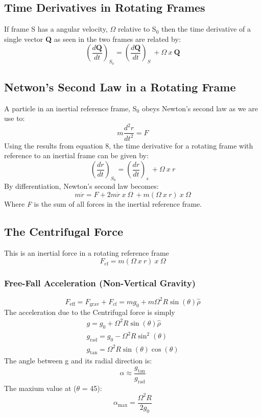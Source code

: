 \documentclass[11pt]{article}
\theoremstyle{definition}
\begin{document}
\subsection{Time Derivatives in Rotating Frames}
If frame S has a angular velocity, $\Omega$ relative to S$_0$ then the time derivative of a single vector \textbf{Q} as seen in the two frames are related by:
\begin{equation}
(\frac{d\textbf{Q}}{dt})_{S_0} = (\frac{d\textbf{Q}}{dt})_{S} \ + \Omega \ x \ \textbf{Q}
\end{equation}
\subsection{Netwon's Second Law in a Rotating Frame}
A particle in an inertial reference frame, S$_0$ obeys Newton's second law as we are use to:
\begin{equation}
m\frac{d^2r}{dt^2} = F
\end{equation}
Using the results from equation 8, the time derivative for a rotating frame with reference to an inertial frame can be given by:
\begin{equation}
(\frac{dr}{dt})_{S_0} = (\frac{dr}{dt})_s \ + \Omega \ x \ r
\end{equation}
By differentiation, Newton's second law becomes:
\begin{equation}
m\ddot{r} = F + 2m\dot{r} \ x \ \Omega \ + m(\Omega \ x \ r) \ x \ \Omega
\end{equation}
Where \textit{F} is the sum of all forces in the inertial reference frame. 
\subsection{The Centrifugal Force}
This is an inertial force in a rotating reference frame 
\begin{equation}
F_{\text{cf}} = m(\Omega \ x \ r) \ x \ \Omega
\end{equation}
\subsubsection*{Free-Fall Acceleration (Non-Vertical Gravity)}
\begin{equation}
F_{\text{eff}} = F_{\text{grav}} + F_{\text{cf}} = mg_0 + m\Omega^2R\sin(\theta)\hat{\rho}
\end{equation}
The acceleration due to the Centrifugal force is simply 
\begin{equation}
\begin{split}
g = g_0 + \Omega^2R\sin(\theta)\hat{\rho} \\
g_{\text{rad}} = g_0 - \Omega^2R\sin^2(\theta)  \\
g_{\text{tan}} = \Omega^2R\sin(\theta)\cos(\theta)
\end{split}
\end{equation}
The angle between g and its radial direction is:
\begin{equation}
\alpha \approx \frac{g_{\text{tan}}}{g_{\text{rad}}} 
\end{equation}
The maxium value at ($\theta$ = 45):
\begin{equation}
\alpha_{\text{max}} =  \frac{\Omega^2R}{2g_0}
\end{equation}
\end{document}
